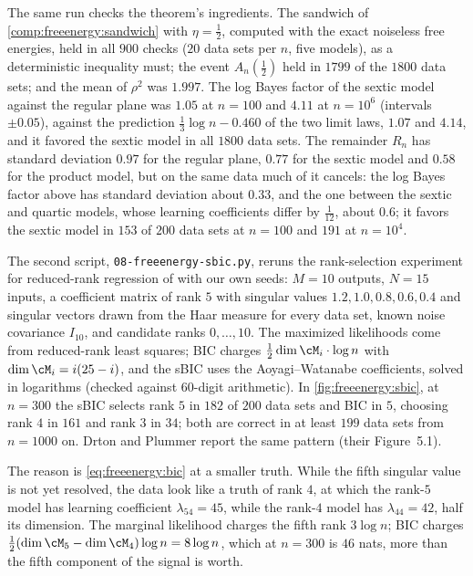 \begin{refsection}
The same run checks the theorem's ingredients. The sandwich of \cref{comp:freeenergy:sandwich} with $\eta=\frac12$, computed with the exact noiseless free energies, held in all $900$ checks ($20$ data sets per $n$, five models), as a deterministic inequality must; the event $A_n(\frac12)$ held in $1799$ of the $1800$ data sets; and the mean of $\rho^2$ was $1.997$. The log Bayes factor of the sextic model against the regular plane was $1.05$ at $n=100$ and $4.11$ at $n=10^6$ (intervals $\pm0.05$), against the prediction $\frac13\log n-0.460$ of the two limit laws, $1.07$ and $4.14$, and it favored the sextic model in all $1800$ data sets. The remainder $R_n$ has standard deviation $0.97$ for the regular plane, $0.77$ for the sextic model and $0.58$ for the product model, but on the same data much of it cancels: the log Bayes factor above has standard deviation about $0.33$, and the one between the sextic and quartic models, whose learning coefficients differ by $\frac1{12}$, about $0.6$; it favors the sextic model in $153$ of $200$ data sets at $n=100$ and $191$ at $n=10^4$.

The second script, \texttt{08-freeenergy-sbic.py}, reruns the rank-selection experiment for reduced-rank regression of \textcite[\S5.1]{DrtonPlummer2017} with our own seeds: $M=10$ outputs, $N=15$ inputs, a coefficient matrix of rank $5$ with singular values $1.2,1.0,0.8,0.6,0.4$ and singular vectors drawn from the Haar measure for every data set, known noise covariance $I_{10}$, and candidate ranks $0,\dots,10$. The maximized likelihoods come from reduced-rank least squares; BIC charges $\frac12\dim\cM_i\cdot\log n$ with $\dim\cM_i=i(25-i)$, and the sBIC uses the Aoyagi--Watanabe coefficients, solved in logarithms (checked against $60$-digit arithmetic). In \cref{fig:freeenergy:sbic}, at $n=300$ the sBIC selects rank $5$ in $182$ of $200$ data sets and BIC in $5$, choosing rank $4$ in $161$ and rank $3$ in $34$; both are correct in at least $199$ data sets from $n=1000$ on. Drton and Plummer report the same pattern (their Figure~5.1).

The reason is \eqref{eq:freeenergy:bic} at a smaller truth. While the fifth singular value is not yet resolved, the data look like a truth of rank $4$, at which the rank-$5$ model has learning coefficient $\lambda_{54}=45$, while the rank-$4$ model has $\lambda_{44}=42$, half its dimension. The marginal likelihood charges the fifth rank $3\log n$; BIC charges $\frac12(\dim\cM_5-\dim\cM_4)\log n=8\log n$, which at $n=300$ is $46$ nats, more than the fifth component of the signal is worth.


\end{refsection}
